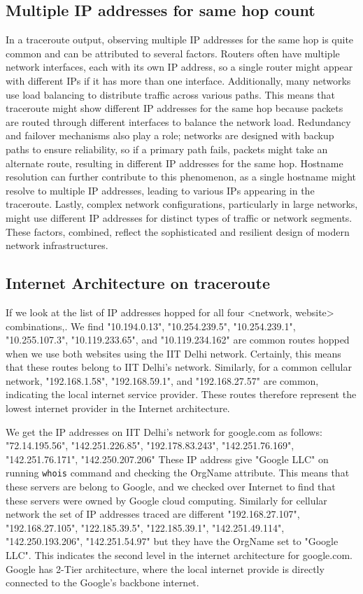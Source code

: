 \documentclass{article}
\begin{document}
\subsection{Multiple IP addresses for same hop count}
\noindent
In a traceroute output, observing multiple IP addresses for the same hop is quite common and can be attributed to several factors. Routers often have multiple network interfaces, each with its own IP address, so a single router might appear with different IPs if it has more than one interface. Additionally, many networks use load balancing to distribute traffic across various paths. This means that traceroute might show different IP addresses for the same hop because packets are routed through different interfaces to balance the network load. Redundancy and failover mechanisms also play a role; networks are designed with backup paths to ensure reliability, so if a primary path fails, packets might take an alternate route, resulting in different IP addresses for the same hop. Hostname resolution can further contribute to this phenomenon, as a single hostname might resolve to multiple IP addresses, leading to various IPs appearing in the traceroute. Lastly, complex network configurations, particularly in large networks, might use different IP addresses for distinct types of traffic or network segments. These factors, combined, reflect the sophisticated and resilient design of modern network infrastructures.


\subsection{Internet Architecture on traceroute}

\noindent
If we look at the list of IP addresses hopped for all four <network, website> combinations,. We find "10.194.0.13", "10.254.239.5", "10.254.239.1", "10.255.107.3", "10.119.233.65", and "10.119.234.162" are common routes hopped when we use both websites using the IIT Delhi network. Certainly, this means that these routes belong to IIT Delhi's network. Similarly, for a common cellular network, "192.168.1.58", "192.168.59.1", and "192.168.27.57" are common, indicating the local internet service provider. These routes therefore represent the lowest internet provider in the Internet architecture. 

\noindent 
We get the IP addresses on IIT Delhi's network for google.com as follows: "72.14.195.56", "142.251.226.85", "192.178.83.243", "142.251.76.169", "142.251.76.171", "142.250.207.206" These IP address give "Google LLC" on running \verb|whois| command and checking the OrgName attribute. This means that these servers are belong to Google, and we checked over Internet to find that these servers were owned by Google cloud computing. Similarly for cellular network the set of IP addresses traced are different "192.168.27.107", "192.168.27.105", "122.185.39.5", "122.185.39.1", "142.251.49.114", "142.250.193.206", "142.251.54.97" but they have the OrgName set to "Google LLC". This indicates the second level in the internet architecture for google.com. Google has 2-Tier architecture, where the local internet provide is directly connected to the Google's backbone internet.
\end{document}
